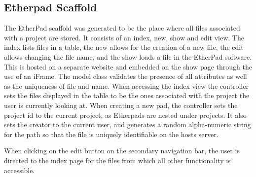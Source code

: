 \documentclass[a4wide, 11pt]{article}
\begin{document}
\subsection{Etherpad Scaffold}
The EtherPad scaffold was generated to be the place where all files associated with a project are stored. It consists of an index, new, show and edit view. The index lists files in a table, the new allows for the creation of a new file, the edit allows changing the file name, and the show loads a file in the EtherPad software. This is hosted on a separate website and embedded on the show page through the use of an iFrame. The model class validates the presence of all attributes as well as the uniqueness of file and name. When accessing the index view the controller sets the files displayed in the table to be the ones associated with the project the user is currently looking at. When creating a new pad, the controller sets the project id to the current project, as Etherpads are nested under projects. It also sets the creator to the current user, and generates a random alpha-numeric string for the path so that the file is uniquely identifiable on the hosts server. 

When clicking on the edit button on the secondary navigation bar, the user is directed to the index page for the files from which all other functionality is accessible. 
\end{document}
